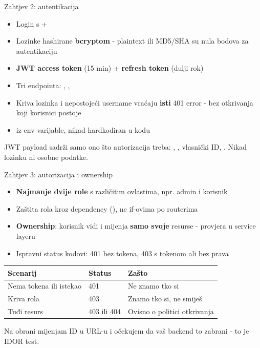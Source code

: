 \begin{frame}{Zahtjev 2: autentikacija}
\begin{itemize}
  \item Login s  + 
  \item Lozinke hashirane \textbf{bcryptom} - plaintext ili MD5/SHA su nula bodova za autentikaciju
  \item \textbf{JWT access token} (15 min) + \textbf{refresh token} (dulji rok)
  \item Tri endpointa: , , 
  \item Kriva lozinka i nepostojeći username vraćaju \textbf{isti} 401 error - bez otkrivanja koji korisnici postoje
  \item {} iz env varijable, nikad hardkodiran u kodu
\end{itemize}

\vspace{0.4em}
JWT payload sadrži samo ono što autorizacija treba: , , vlasnički ID, . Nikad lozinku ni osobne podatke.
\end{frame}

\begin{frame}{Zahtjev 3: autorizacija i ownership}
\begin{itemize}
  \item \textbf{Najmanje dvije role} s različitim ovlastima, npr. admin i korisnik
  \item Zaštita rola kroz dependency (), ne if-ovima po routerima
  \item \textbf{Ownership}: korisnik vidi i mijenja \textbf{samo svoje} resurse - provjera u service layeru
  \item Ispravni status kodovi: 401 bez tokena, 403 s tokenom ali bez prava
\end{itemize}

\vspace{0.6em}
\begin{tabular}{@{}lll@{}}
  \toprule
  \textbf{Scenarij} & \textbf{Status} & \textbf{Zašto} \\
  \midrule
  Nema tokena ili istekao & 401 & Ne znamo tko si \\
  Kriva rola & 403 & Znamo tko si, ne smiješ \\
  Tuđi resurs & 403 ili 404 & Ovisno o politici otkrivanja \\
  \bottomrule
\end{tabular}

\vspace{0.4em}
Na obrani mijenjam ID u URL-u i očekujem da vaš backend to zabrani - to je IDOR test.
\end{frame}

